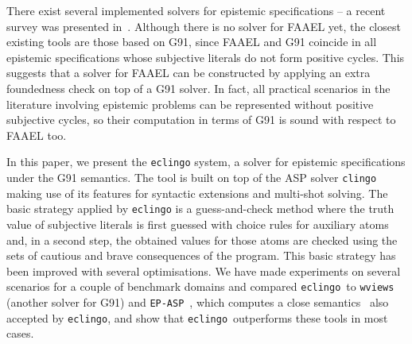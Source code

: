 \documentclass{new_tlp}
\def\eclingo{{\tt eclingo}}
\def\wviews{{\tt \wviews}}
\def\clingo{{\tt clingo}}
\def\wviews{{\tt wviews}}
\def\EPASP{{\tt EP-ASP}}
\begin{document}
There exist several implemented solvers for epistemic specifications -- a recent survey was presented in~\cite{leckah18}.
%
Although there is no solver for FAAEL yet, the closest existing tools are those based on G91, since FAAEL and G91 coincide in all epistemic specifications whose subjective literals do not form positive cycles.
%
This suggests that a solver for FAAEL can be constructed by applying an extra foundedness check on top of a G91 solver.
%
In fact, all practical scenarios in the literature involving epistemic problems can be represented without positive subjective cycles, so their computation in terms of G91 is sound with respect to FAAEL too.

In this paper, we present the \eclingo{} system, a solver for epistemic specifications under the G91 semantics.
%
The tool is built on top of the ASP solver \clingo~\cite{gekakasc17a}
making use of its features for syntactic extensions and multi-shot solving.
%
The basic strategy applied by \eclingo{} is a guess-and-check method where the truth value of subjective literals is first guessed with choice rules for auxiliary atoms and, in a second step, the obtained values for those atoms are checked using the sets of cautious and brave consequences of the program.
%
This basic strategy has been improved with several optimisations.
%
We have made experiments on several scenarios for a couple of benchmark domains and compared \eclingo\ to
\wviews~\cite{Kelly07} (another solver for G91) and \EPASP~\cite{SLKL17},
which computes a close semantics~\cite{kawabagezh15} also accepted by \eclingo{},
and show that \eclingo\ outperforms these tools in most cases.




\end{document}
